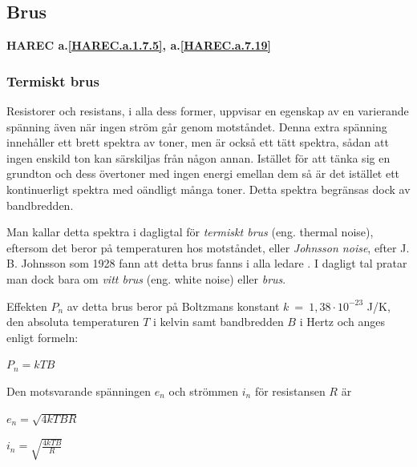 \subsection{Brus}
\textbf{HAREC a.\ref{HAREC.a.1.7.5}\label{myHAREC.a.1.7.5}, a.\ref{HAREC.a.7.19}\label{myHAREC.a.7.19}}
\label{termisktbrus}

\subsubsection{Termiskt brus}

\begin{rev-nytt}[MAD]
Resistorer och resistans, i alla dess former, uppvisar en egenskap av
en varierande spänning även när ingen ström går genom motståndet. Denna extra
spänning innehåller ett brett spektra av toner, men är också ett tätt spektra,
sådan att ingen enskild ton kan särskiljas från någon annan. Istället för att
tänka sig en grundton och dess övertoner med ingen energi emellan dem så är det
istället ett kontinuerligt spektra med oändligt många toner. Detta spektra
begränsas dock av bandbredden.




Man kallar detta spektra i dagligtal för \emph{termiskt brus}
(eng. thermal noise), eftersom det beror på temperaturen hos motståndet, eller
\emph{Johnsson noise}, efter J. B. Johnsson som 1928 fann att detta brus fanns
i alla ledare \cite{ott1988}.
I dagligt tal pratar man dock bara om \emph{vitt brus} (eng. white noise) eller
\emph{brus}.

Effekten \(P_n\) av detta brus beror på Boltzmans konstant
\(k\ =\ 1,38 \cdot 10^{-23}\) J/K, den absoluta temperaturen \(T\) i
kelvin samt bandbredden \(B\) i Hertz och anges enligt formeln:

\(P_n = k T B\)

Den motsvarande spänningen \(e_n\) och strömmen \(i_n\) för resistansen \(R\) är

\(e_n = \sqrt{4kTBR}\)

\(i_n = \sqrt{\frac{4kTB}{R}}\)

\end{rev-nytt}

